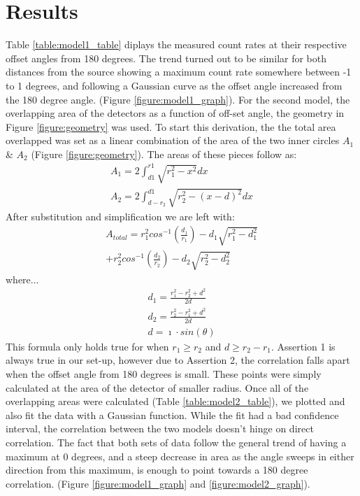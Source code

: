 \documentclass[12pt, letterpaper, twocolumn]{article}
\begin{document}
\section{Results}
Table \ref{table:model1_table} diplays the measured count rates at their
respective offset angles from 180 degrees. The trend turned out to be similar
for both distances from the source showing a maximum count rate somewhere
between -1 to 1 degrees, and following a Gaussian curve as the offset angle
increased from the 180 degree angle. (Figure \ref{figure:model1_graph}).
For the second model, the overlapping area of the detectors as a function of
off-set angle, the geometry in Figure \ref{figure:geometry} was used. To start
this derivation, the the total area overlapped was set as a linear combination
of the area of the two inner circles $A_{1}$ \& $A_{2}$ (Figure
\ref{figure:geometry}). The areas of these pieces follow as:
\begin{equation}
  \begin{gathered}
   A_{1} = 2\int_{d1}^{r1}\sqrt{r_{1}^{2}-x^{2}}dx \nonumber\\
   A_{2} = 2\int_{d-r_{2}}^{d1}\sqrt{r_{2}^{2}-(x-d)^{2}}dx \nonumber
  \end{gathered}
\end{equation}
After substitution and simplification we are left with:
\begin{equation}
  \begin{aligned}
  A_{total}=r_{1}^{2}cos^{-1}(\frac{d_{1}}{r_{1}})−d_{1}\sqrt{r_{1}^{2}−d_{1}^
  {2}}\\+r_{2}^{2}cos^{-1}(\frac{d_{2}}{r_{2}})−d_{2}\sqrt{r_{2}^{2}−d_{2}^{2}}
  \nonumber
  \end{aligned}
\end{equation}
where...
\begin{equation}
  \begin{aligned}
  d_{1} = \frac{r_{1}^{2}-r_{2}^{2}+d^{2}}{2d} \nonumber \\ d_{2} =
  \frac{r_{2}^{2}-r_{1}^{2}+d^{2}}{2d} \nonumber \\ d = \imath \cdot sin(\theta)
  \end{aligned}
\end{equation}
This formula only holds true for when $r_{1}\geq r_{2}$ and $d \geq r_{2} -
r_{1}$. Assertion 1 is always true in our set-up, however due to Assertion 2,
the correlation falls apart when the offset angle from 180 degrees is small.
These points were simply calculated at the area of the detector of smaller radius.
Once all of the overlapping areas were calculated (Table
\ref{table:model2_table}), we plotted and also fit the data with a Gaussian
function. While the fit had a bad confidence interval, the correlation between
the two models doesn't hinge on direct correlation. The fact that both sets of
data follow the general trend of having a maximum at 0 degrees, and a steep decrease
in area as the angle sweeps in either direction from this maximum, is enough to
point towards a 180 degree correlation. (Figure \ref{figure:model1_graph} and
\ref{figure:model2_graph}).
\end{document}
